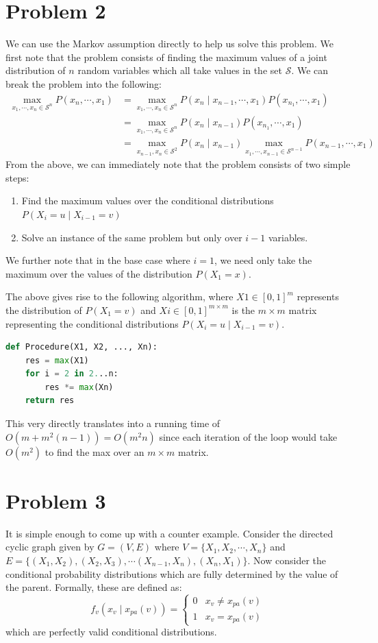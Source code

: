 \documentclass[12pt]{article}
\begin{document}
\section*{Problem 2}
We can use the Markov assumption directly to help us solve this problem. We first note that the problem consists of finding the maximum values of a joint distribution of $n$ random variables which all take values in the set $\mathcal{S}$. We can break the problem into the following:
\begin{align*}
\max_{x_1, \cdots, x_n \in \mathcal{S}^n} P(x_n, \cdots, x_1) &= \max_{x_1, \cdots, x_n \in \mathcal{S}^n} P(x_n \mid x_{n-1}, \cdots, x_1)P(x_{n_1}, \cdots, x_1) \tag{definition of joint distribution} \\
&=  \max_{x_1, \cdots, x_n \in \mathcal{S}^n} P(x_n \mid x_{n-1})P(x_{n_1}, \cdots, x_1) \tag{Markov assumption} \\
&=\max_{x_{n-1}, x_n \in \mathcal{S}^2} P(x_n \mid x_{n-1}) \max_{x_1, \cdots, x_{n-1} \in \mathcal{S}^{n-1}}P(x_{n-1}, \cdots, x_1) 
\end{align*}
From the above, we can immediately note that the problem consists of two simple steps:
\begin{enumerate}
\item Find the maximum values over the conditional distributions $P(X_i = u \mid X_{i-1} = v)$
\item Solve an instance of the same problem but only over $i - 1$ variables.
\end{enumerate}
We further note that in the base case where $i = 1$, we need only take the maximum over the values of the distribution $P(X_1 = x)$.

The above gives rise to the following algorithm, where $X1 \in [0,1]^m$ represents the distribution of $P(X_1 = v)$ and $Xi \in [0,1]^{m \times m}$ is the $m \times m$ matrix representing the conditional distributions $P(X_i = u \mid X_{i-1} = v)$.
\begin{lstlisting}[language=Python]
def Procedure(X1, X2, ..., Xn):
	res = max(X1)
	for i = 2 in 2...n:
		res *= max(Xn)
	return res
\end{lstlisting}
This very directly translates into a running time of $O(m + m^2(n-1)) = O(m^2n)$ since each iteration of the loop would take $O(m^2)$ to find the max over an $m \times m$ matrix.

\pagebreak
\section*{Problem 3}
It is simple enough to come up with a counter example. Consider the directed cyclic graph given by $G = (V,E)$ where $V = \{X_1, X_2, \cdots, X_n \}$ and $E = \{(X_1,X_2), (X_2,X_3),\cdots (X_{n-1}, X_n), (X_n,X_1) \}$. Now consider the conditional probability distributions which are fully determined by the value of the parent. Formally, these are defined as:
$$
f_v(x_v \mid x_{pa}(v)) = \begin{cases} 
    0 & x_v \neq x_{pa}(v) \\
    1 & x_v = x_{pa}(v)
 \end{cases}
$$
which are perfectly valid conditional distributions.
\end{document}
